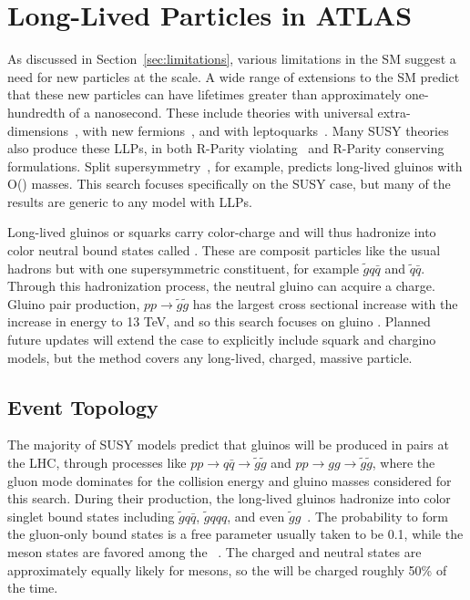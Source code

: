\chapter{Long-Lived Particles in ATLAS}

\label{ch:simulation}

As discussed in Section~\ref{sec:limitations}, various limitations in the \ac{SM} suggest a need for new particles at the \TeV scale. 
A wide range of extensions to the \acl{SM} predict that these new particles can have lifetimes greater than approximately one-hundredth of a nanosecond.
These include theories with universal extra-dimensions~\cite{extra_dim1, extra_dim2}, with new fermions~\cite{newfermions}, and with leptoquarks~\cite{leptoquark}.
Many \ac{SUSY} theories also produce these \acp{LLP}, in both R-Parity violating~\cite{rpv1, rpv2, rpv3} and R-Parity conserving~\cite{rpc1, rpc2, rpc3, rpc4} formulations.
Split supersymmetry~\cite{split1, split2}, for example, predicts long-lived gluinos with O(\TeV) masses.
This search focuses specifically on the \ac{SUSY} case, but many of the results are generic to any model with \acp{LLP}. 

Long-lived gluinos or squarks carry color-charge and will thus hadronize into color neutral bound states called \rhadrons.
These are composit particles like the usual hadrons but with one supersymmetric constituent, for example $\tilde{g}q\bar{q}$ and $\tilde{q}\bar{q}$.
Through this hadronization process, the neutral gluino can acquire a charge.
Gluino pair production, $p p\rightarrow \tilde{g}\tilde{g}$ has the largest cross sectional increase with the increase in energy to 13 TeV, and so this search focuses on gluino \rhadrons.
Planned future updates will extend the case to explicitly include squark and chargino models, but the method covers any long-lived, charged, massive particle.

\section{Event Topology}
\label{sec:characteristics}

The majority of SUSY models predict that gluinos will be produced in pairs at the \ac{LHC}, through processes like $p p \rightarrow q\bar{q} \rightarrow \tilde{g}\tilde{g}$ and $p p \rightarrow g g \rightarrow \tilde{g}\tilde{g}$, where the gluon mode dominates for the collision energy and gluino masses considered for this search.
During their production, the long-lived gluinos hadronize into color singlet bound states including $\tilde{g}q\bar{q}$, $\tilde{g}qqq$, and even $\tilde{g}g$~\cite{rhadron}.
The probability to form the gluon-only bound states is a free parameter usually taken to be 0.1, while the meson states are favored among the \rhadrons~\cite{rhad_atlas}.
The charged and neutral states are approximately equally likely for mesons, so the \rhadrons will be charged roughly 50\% of the time.

